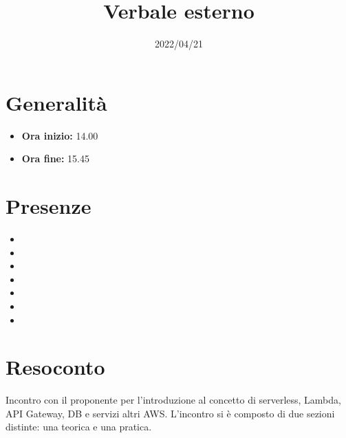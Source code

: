 \documentclass{classes/base}
\title{Verbale esterno}
\date{2022/04/21}
\author{\giulio}
\renewcommand{\maketitle}{
    
}
\begin{document}
    \maketitle

    \section*{Generalità}
    \begin{itemize}
        \item \textbf{Ora inizio:} 14.00
        \item \textbf{Ora fine:} 15.45
    \end{itemize}

    \section*{Presenze}
    \begin{itemize}
        \item \tommaso
        \item \marcob
        \item \marcov
        \item \angela
        \item \giulio
        \item \ruth
        \item \matteo
    \end{itemize}

    \section*{Resoconto}
    Incontro con il proponente per l'introduzione al concetto di serverless, Lambda, API Gateway, DB e servizi altri AWS.
    L'incontro si è composto di due sezioni distinte: una teorica e una pratica.
\end{document}
